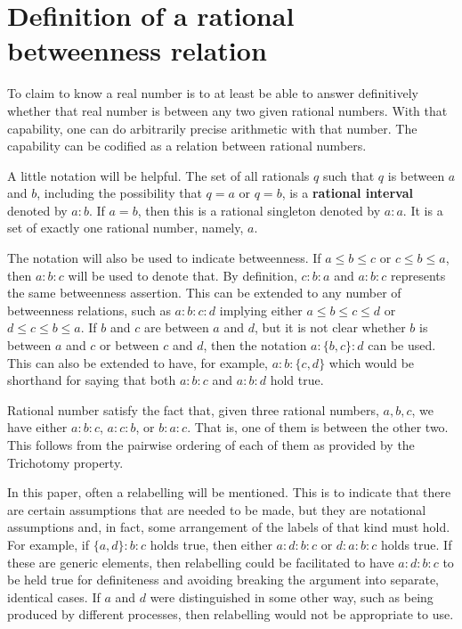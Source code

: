 \documentclass[12pt]{article}
\begin{document}
\section{Definition of a rational betweenness relation}

To claim to know a real number is to at least be able to answer definitively whether that real number is between any two given rational numbers. With that capability, one can do arbitrarily precise arithmetic with that number. The capability can be codified as a relation between rational numbers. 

A little notation will be helpful. The set of all rationals $q$ such that $q$ is between $a$ and $b$, including the possibility that $q=a$ or $q=b$, is a \textbf{rational interval} denoted by $a:b$. If $a=b$, then this is a rational singleton denoted by $a:a$. It is a set of exactly one rational number, namely, $a$. 

The notation will also be used to indicate betweenness. If $a \leq b \leq c$ or $c \leq b \leq a$, then $a:b:c$ will be used to denote that. By definition, $c:b:a$ and $a:b:c$ represents the same betweenness assertion. This can be extended to any number of betweenness relations, such as $a:b:c:d$ implying either $a \leq b \leq c \leq d$ or $d \leq c \leq b \leq a$. If $b$ and $c$ are between $a$ and $d$, but it is not clear whether $b$ is between $a$ and $c$ or between $c$ and $d$, then the notation $a:\{b,c\}:d$ can be used. This can also be extended to have, for example, $a:b:\{c,d\}$ which would be shorthand for saying that both $a:b:c$ and $a:b:d$ hold true. 

Rational number satisfy the fact that, given three rational numbers, $a, b, c$, we have either $a:b:c$, $a:c:b$, or $b:a:c$. That is, one of them is between the other two. This follows from the pairwise ordering of each of them as provided by the Trichotomy property. 

In this paper, often a relabelling will be mentioned. This is to indicate that there are certain assumptions that are needed to be made, but they are notational assumptions and, in fact, some arrangement of the labels of that kind must hold. For example, if $\{a,d\}:b:c$ holds true, then either $a:d:b:c$ or $d:a:b:c$ holds true. If these are generic elements, then relabelling could be facilitated to have $a:d:b:c$ to be held true for definiteness and avoiding breaking the argument into separate, identical cases. If $a$ and $d$ were distinguished in some other way, such as being produced by different processes, then relabelling would not be appropriate to use. 
\end{document}
